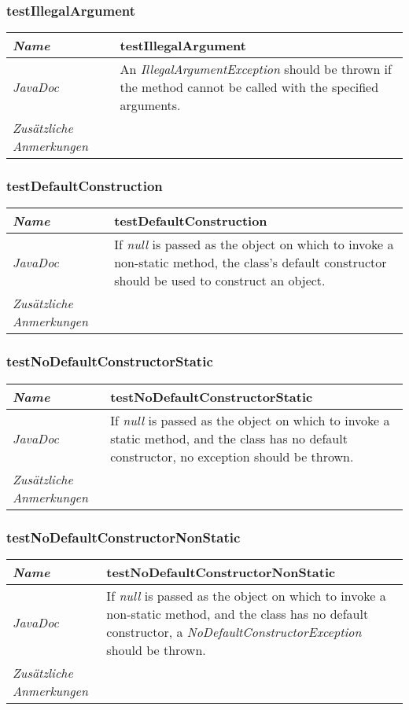 \documentclass[a4paper]{report}
\begin{document}
\subsubsection{testIllegalArgument}
\begin{tabular}{p{2.3cm}  p{11.5cm}}
  \hline
 \textit{Name} & testIllegalArgument\\
  \hline
 \textit{JavaDoc} & An \emph{IllegalArgumentException} should be thrown if the method cannot be called with the specified arguments.\\
  \hline
 \textit{Zusätzliche Anmerkungen} & \\
  \hline
\end{tabular}

\subsubsection{testDefaultConstruction}
\begin{tabular}{p{2.3cm}  p{11.5cm}}
  \hline
 \textit{Name} & testDefaultConstruction\\
  \hline
 \textit{JavaDoc} & If \emph{null} is passed as the object on which to invoke a non-static method, the class's default constructor should be used to construct an object. \\
  \hline
 \textit{Zusätzliche Anmerkungen} & \\
  \hline
\end{tabular}

\subsubsection{testNoDefaultConstructorStatic}
\begin{tabular}{p{2.3cm}  p{11.5cm}}
  \hline
 \textit{Name} & testNoDefaultConstructorStatic\\
  \hline
 \textit{JavaDoc} & If \emph{null} is passed as the object on which to invoke a static method, and the class has no default constructor, no exception should be thrown. \\
  \hline
 \textit{Zusätzliche Anmerkungen} & \\
  \hline
\end{tabular}

\subsubsection{testNoDefaultConstructorNonStatic}
\begin{tabular}{p{2.3cm}  p{11.5cm}}
  \hline
 \textit{Name} & testNoDefaultConstructorNonStatic\\
  \hline
 \textit{JavaDoc} & If \emph{null} is passed as the object on which to invoke a non-static method, and the class has no default constructor, a \emph{NoDefaultConstructorException} should be thrown. \\
  \hline
 \textit{Zusätzliche Anmerkungen} & \\
  \hline
\end{tabular}
\end{document}
